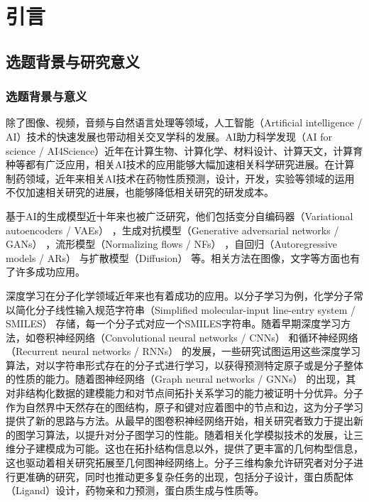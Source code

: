 \titlespacing{\chapter}{0pt}{-50pt}{0pt}
\chapter{引言}
\label{chap:introduction}
\section{选题背景与研究意义}
\subsection{选题背景与意义}
除了图像、视频，音频与自然语言处理等领域，人工智能（Artificial intelligence / AI）技术的快速发展也带动相关交叉学科的发展。AI助力科学发现（AI for science / AI4Science）近年在计算生物、计算化学、材料设计、计算天文，计算育种等都有广泛应用，相关AI技术的应用能够大幅加速相关科学研究进展。在计算制药领域，近年来相关AI技术在药物性质预测，设计，开发，实验等领域的运用不仅加速相关研究的进展，也能够降低相关研究的研发成本。

基于AI的生成模型近十年来也被广泛研究，他们包括变分自编码器（Variational autoencoders / VAEs） \cite{vae_kingma_13}，生成对抗模型（Generative adversarial networks / GANs） \cite{gan_goodfellow_14}，流形模型（Normalizing flows / NFs） \cite{nice_dinh_15,density_dinh_17}，自回归（Autoregressive models / ARs） \cite{ar_oord_16}与扩散模型（Diffusion） \cite{deepunsupervised_dickstein_15,generative_song_19}等。相关方法在图像，文字等方面也有了许多成功应用。

深度学习在分子化学领域近年来也有着成功的应用。以分子学习为例，化学分子常以简化分子线性输入规范字符串（Simplified molecular-input line-entry system / SMILES） \cite{smiles_weinberger_88}存储，每一个分子式对应一个SMILES字符串。随着早期深度学习方法，如卷积神经网络（Convolutional neural networks / CNNs） \cite{cnnsmiles_hirohara_18}和循环神经网络（Recurrent neural networks / RNNs） \cite{rnnsmiles_bjerrum_17,practicalmodel_liu_19,deeppurpose_huang_20}的发展，一些研究试图运用这些深度学习算法，对以字符串形式存在的分子式进行学习，以获得预测特定原子或是分子整体的性质的能力。随着图神经网络（Graph neural networks / GNNs） \cite{semisupervised_kipf_17,inductive_hamilton_17,howpowerful_xu_18}的出现，其对非结构化数据的建模能力和对节点间拓扑关系学习的能力被证明十分优异。分子作为自然界中天然存在的图结构，原子和键对应着图中的节点和边，这为分子学习提供了新的思路与方法。从最早的图卷积神经网络开始，相关研究者致力于提出新的图学习算法，以提升对分子图学习的性能。随着相关化学模拟技术的发展，让三维分子建模成为可能。这也在拓扑结构信息以外，提供了更丰富的几何构型信息，这也驱动着相关研究拓展至几何图神经网络上。分子三维构象允许研究者对分子进行更准确的研究，同时也推动更多复杂任务的出现，包括分子设计，蛋白质配体（Ligand）设计，药物亲和力预测，蛋白质生成与性质等。

